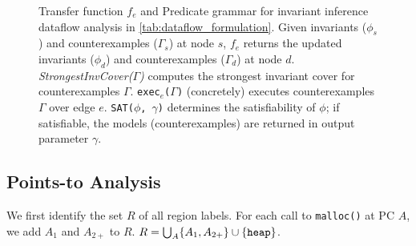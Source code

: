 \begin{figure}[t]
\begin{center}
\begin{subfigure}[t]{.52\textwidth}
\end{subfigure}%
\caption{Transfer function $f_e$ and Predicate grammar for invariant inference dataflow analysis in \cref{tab:dataflow_formulation}.
Given invariants ($\phi_{s}$) and counterexamples ($\Gamma_{s}$) at node $s$,
$f_e$ returns the updated
invariants ($\phi_{d}$) and counterexamples ($\Gamma_{d}$) at
node $d$.
{\em StrongestInvCover($\Gamma$)} computes the strongest invariant cover for counterexamples $\Gamma$.
{\tt exec$_e$($\Gamma$)} (concretely) executes
counterexamples $\Gamma$ over edge $e$.
{\tt SAT($\phi$, $\gamma$)} determines
the satisfiability of $\phi$; if satisfiable, the models (counterexamples) are returned in output parameter $\gamma$.}
\end{center}
\end{figure}


\subsection{Points-to Analysis}
\label{sec:pointsToFormal}
We first identify the set $R$ of all region labels.
For each call to {\tt malloc()} at PC $A$,
we add $A_1$ and $A_{2+}$ to $R$. $R=\bigcup_{A}\{A_1,A_{2+}\}\cup\{{\tt heap}\}$.


